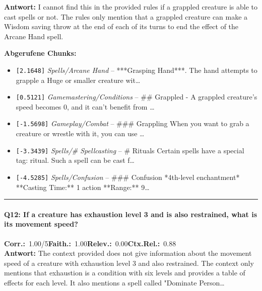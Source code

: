 \noindent\textbf{Antwort:} I cannot find this in the provided rules if a grappled creature is able to cast spells or not. The rules only mention that a grappled creature can make a Wisdom saving throw at the end of each of its turns to end the effect of the Arcane Hand spell.

\noindent\textbf{Abgerufene Chunks:}
\begin{itemize}[noitemsep, topsep=2pt]
  \item[\textbf{\#1}] \texttt{[2.1648]} \textit{Spells/Arcane Hand} -- ***Grasping Hand***. The hand attempts to grapple a Huge or smaller creature wit\ldots
  \item[\textbf{\#2}] \texttt{[0.5121]} \textit{Gamemastering/Conditions} -- \#\# Grappled  - A grappled creature's speed becomes 0, and it can't benefit from \ldots
  \item[\textbf{\#3}] \texttt{[-1.5698]} \textit{Gameplay/Combat} -- \#\#\# Grappling  When you want to grab a creature or wrestle with it, you can use \ldots
  \item[\textbf{\#4}] \texttt{[-3.3439]} \textit{Spells/# Spellcasting} -- \# Rituals  Certain spells have a special tag: ritual. Such a spell can be cast f\ldots
  \item[\textbf{\#5}] \texttt{[-4.5285]} \textit{Spells/Confusion} -- \#\#\# Confusion  *4th-level enchantment*  **Casting Time:** 1 action  **Range:** 9\ldots
\end{itemize}
\vspace{4pt}
\hrule
\vspace{6pt}

\paragraph{Q12: If a creature has exhaustion level 3 and is also restrained, what is its movement speed?}
\noindent \textbf{Corr.:}~1.00/5\quad \textbf{Faith.:}~1.00\quad \textbf{Relev.:}~0.00\quad \textbf{Ctx.Rel.:}~0.88\\

\noindent\textbf{Antwort:} The context provided does not give information about the movement speed of a creature with exhaustion level 3 and also restrained. The context only mentions that exhaustion is a condition with six levels and provides a table of effects for each level. It also mentions a spell called "Dominate Person\ldots

